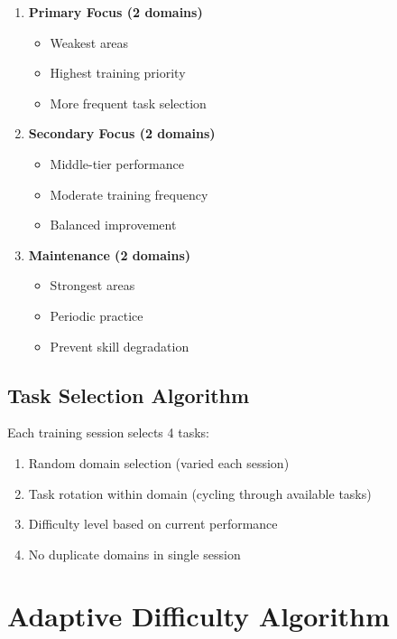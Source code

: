 \documentclass[12pt,a4paper]{article}
\begin{document}
\begin{enumerate}
    \item \textbf{Primary Focus (2 domains)}
    \begin{itemize}
        \item Weakest areas
        \item Highest training priority
        \item More frequent task selection
    \end{itemize}
    
    \item \textbf{Secondary Focus (2 domains)}
    \begin{itemize}
        \item Middle-tier performance
        \item Moderate training frequency
        \item Balanced improvement
    \end{itemize}
    
    \item \textbf{Maintenance (2 domains)}
    \begin{itemize}
        \item Strongest areas
        \item Periodic practice
        \item Prevent skill degradation
    \end{itemize}
\end{enumerate}

\subsection{Task Selection Algorithm}

Each training session selects 4 tasks:
\begin{enumerate}
    \item Random domain selection (varied each session)
    \item Task rotation within domain (cycling through available tasks)
    \item Difficulty level based on current performance
    \item No duplicate domains in single session
\end{enumerate}

\section{Adaptive Difficulty Algorithm}
\end{document}
